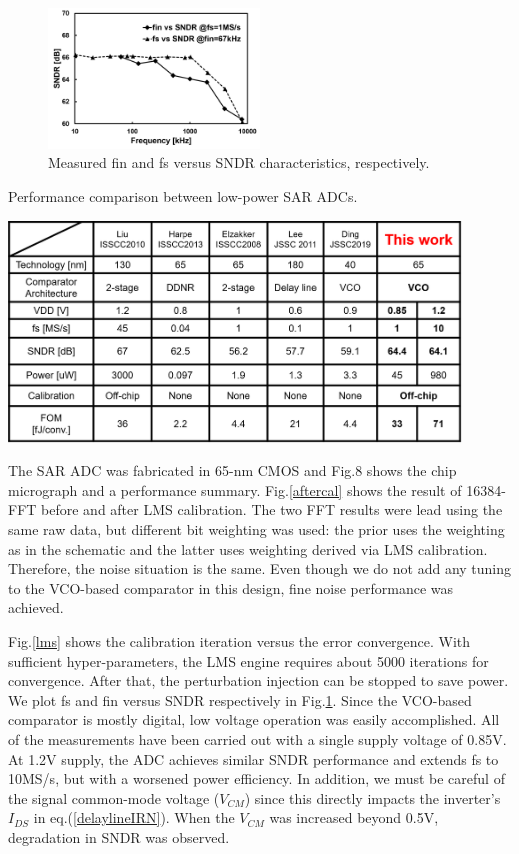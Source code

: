 \documentclass[letterpaper, 10 pt, conference]{ieeeconf}  %
\begin{document}
\begin{figure}[ht!]
\centering
 \includegraphics[width=0.5\textwidth]{figs/freq-sndr.png}
  \captionsetup{font=footnotesize}
  \caption{Measured fin and fs versus SNDR characteristics, respectively.}
  \label{freqvssndr}
\end{figure}

\begin{table}[ht!]
\centering
 \caption{Performance comparison between low-power SAR ADCs.}
 \includegraphics[width=0.9\textwidth]{figs/table.png}
  \captionsetup{font=footnotesize}
  \label{performancecomp}
\end{table}

The SAR ADC was fabricated in 65-nm CMOS and Fig.8 shows the chip micrograph and a performance summary. 
Fig.\ref{aftercal} shows the result of 16384-FFT before and after LMS calibration. The two FFT results were lead using the same raw data, but different bit weighting was used: the prior uses the weighting as in the schematic and the latter uses weighting derived via LMS calibration. Therefore, the noise situation is the same. Even though we do not add any tuning to the VCO-based comparator in this design, fine noise performance was achieved. 

Fig.\ref{lms} shows the calibration iteration versus the error convergence. With sufficient hyper-parameters, the LMS engine requires about 5000 iterations for convergence. After that, the perturbation injection can be stopped to save power. 
We plot fs and fin versus SNDR respectively in Fig.\ref{freqvssndr}. Since the VCO-based comparator is mostly digital, low voltage operation was easily accomplished. All of the measurements have been carried out with a single supply voltage of 0.85V. At 1.2V supply, the ADC achieves similar SNDR performance and extends fs to 10MS/s, but with a worsened power efficiency. In addition, we must be careful of the signal common-mode voltage ($V_{CM}$) since this directly impacts the inverter’s $I_{DS}$ in eq.(\ref{delaylineIRN}). When the $V_{CM}$ was increased beyond 0.5V, degradation in SNDR was observed.
\end{document}
